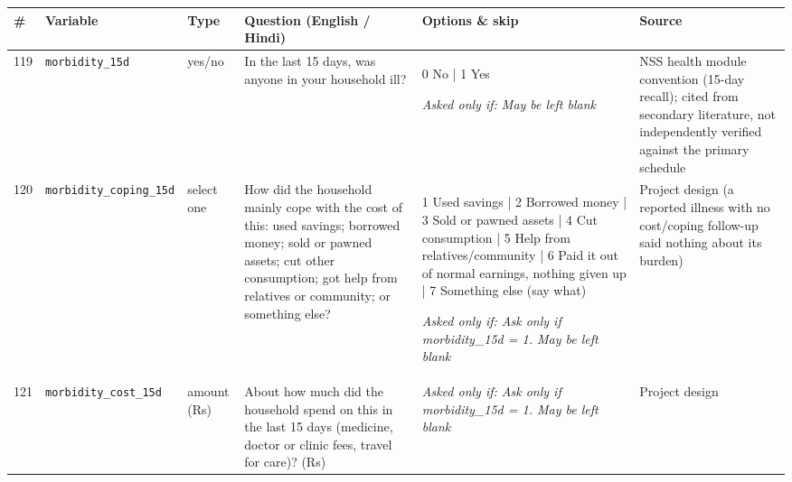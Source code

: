 \documentclass[9pt,a4paper,landscape]{article}
\begin{document}
\begin{longtable}{@{}p{0.5cm}p{3.3cm}p{1.7cm}p{7.3cm}p{5.6cm}p{5.4cm}@{}}
\toprule \footnotesize\textbf{\#} & \footnotesize\textbf{Variable} & \footnotesize\textbf{Type} & \footnotesize\textbf{Question (English / Hindi)} & \footnotesize\textbf{Options {\&} skip} & \footnotesize\textbf{Source}\\ \midrule
\endhead
\footnotesize 119 & \footnotesize\texttt{morbidity\_15d} & \scriptsize yes/no & \footnotesize In the last 15 days, was anyone in your household ill?\par\vspace{1pt}{\footnotesize\color{hdr}{\hifont पिछले 15 दिनों में क्या आपके घर में कोई बीमार पड़ा?}} & \scriptsize 0 No | 1 Yes\par\vspace{1pt}\textit{Asked only if: May be left blank} & \scriptsize NSS health module convention (15-day recall); cited from secondary literature, not independently verified against the primary schedule\\
\footnotesize 120 & \footnotesize\texttt{morbidity\_coping\_15d} & \scriptsize select one & \footnotesize How did the household mainly cope with the cost of this: used savings; borrowed money; sold or pawned assets; cut other consumption; got help from relatives or community; or something else?\par\vspace{1pt}{\footnotesize\color{hdr}{\hifont इसका ख़र्च आपके घर ने मुख्य रूप से कैसे उठाया: जमा पैसे से; उधार लेकर; कुछ बेचकर या गिरवी रखकर; बाकी ख़र्च घटाकर; रिश्तेदारों या गाँव वालों की मदद से; या किसी और तरह?}} & \scriptsize 1 Used savings | 2 Borrowed money | 3 Sold or pawned assets | 4 Cut consumption | 5 Help from relatives/community | 6 Paid it out of normal earnings, nothing given up | 7 Something else (say what)\par\vspace{1pt}\textit{Asked only if: Ask only if morbidity\_15d = 1. May be left blank} & \scriptsize Project design (a reported illness with no cost/coping follow-up said nothing about its burden)\\
\footnotesize 121 & \footnotesize\texttt{morbidity\_cost\_15d} & \scriptsize amount (Rs) & \footnotesize About how much did the household spend on this in the last 15 days (medicine, doctor or clinic fees, travel for care)? (Rs)\par\vspace{1pt}{\footnotesize\color{hdr}{\hifont पिछले 15 दिनों में इस पर घर का लगभग कितना ख़र्च हुआ (दवाई, डॉक्टर या क्लीनिक की फ़ीस, आने-जाने का ख़र्च)? (रुपये)}} & \scriptsize \textit{Asked only if: Ask only if morbidity\_15d = 1. May be left blank} & \scriptsize Project design\\

\end{longtable}
\end{document}
